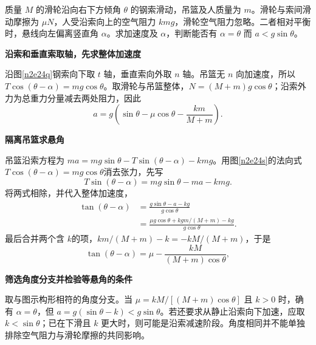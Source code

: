 \begin{question}\begin{example}[相同悬角未必对应理想加速度]\label{n2e24}
质量 $M$ 的滑轮沿向右下方倾角 $\theta$ 的钢索滑动，吊篮及人质量为 $m$。滑轮与索间滑动摩擦为 $\mu N$，人受沿索向上的空气阻力 $kmg$，滑轮空气阻力忽略。二者相对平衡时，悬线向左偏离竖直角 $\alpha$。求加速度及 $\alpha$，判断能否有 $\alpha=\theta$ 而 $a<g\sin\theta$。
\end{example}\end{question}
\begin{solution}\textbf{沿索和垂直索取轴，先求整体加速度}\par\nobreak
沿图\ref{n2e24q}钢索向下取 $t$ 轴，垂直索向外取 $n$ 轴。吊篮无 $n$ 向加速度，所以 $T\cos(\theta-\alpha)=mg\cos\theta$。取滑轮与吊篮整体，$N=(M+m)g\cos\theta$；沿索外力为总重力分量减去两处阻力，因此
\[
 a=g\left(\sin\theta-\mu\cos\theta-\frac{km}{M+m}\right).
\]



\par\medskip{}\noindent\textbf{隔离吊篮求悬角}\par\nobreak
吊篮沿索方程为 $ma=mg\sin\theta-T\sin(\theta-\alpha)-kmg$。用图\ref{n2e24s}的法向式 $T\cos(\theta-\alpha)=mg\cos\theta$消去张力，先写
\[
 T\sin(\theta-\alpha)=mg\sin\theta-ma-kmg.
\]
将两式相除，并代入整体加速度，
\begin{align*}
 \tan(\theta-\alpha)
 &=\frac{g\sin\theta-a-kg}{g\cos\theta}\\
 &=\frac{\mu g\cos\theta+kgm/(M+m)-kg}{g\cos\theta}.
\end{align*}
最后合并两个含 $k$的项，$km/(M+m)-k=-kM/(M+m)$，于是
\[
 \tan(\theta-\alpha)=\mu-\frac{kM}{(M+m)\cos\theta},
\]


\par\medskip{}\noindent\textbf{筛选角度分支并检验等悬角的条件}\par\nobreak
取与图示构形相符的角度分支。当 $\mu=kM/[(M+m)\cos\theta]$ 且 $k>0$ 时，确有 $\alpha=\theta$，但 $a=g(\sin\theta-k)<g\sin\theta$。若还要求从静止沿索向下加速，应取 $k<\sin\theta$；已在下滑且 $k$ 更大时，则可能是沿索减速阶段。角度相同并不能单独排除空气阻力与滑轮摩擦的共同影响。
\end{solution}
